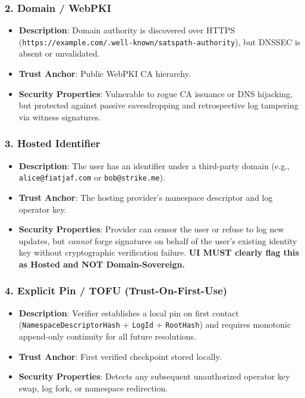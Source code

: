 \documentclass[
]{article}
\providecommand{\tightlist}{%
  \setlength{\itemsep}{0pt}\setlength{\parskip}{0pt}}
\begin{document}
\hypertarget{domain-webpki}{%
\subsubsection{2. Domain / WebPKI}\label{domain-webpki}}

\begin{itemize}
\tightlist
\item
  \textbf{Description}: Domain authority is discovered over HTTPS
  (\texttt{https://example.com/.well-known/satspath-authority}), but
  DNSSEC is absent or unvalidated.
\item
  \textbf{Trust Anchor}: Public WebPKI CA hierarchy.
\item
  \textbf{Security Properties}: Vulnerable to rogue CA issuance or DNS
  hijacking, but protected against passive eavesdropping and
  retrospective log tampering via witness signatures.
\end{itemize}

\hypertarget{hosted-identifier}{%
\subsubsection{3. Hosted Identifier}\label{hosted-identifier}}

\begin{itemize}
\tightlist
\item
  \textbf{Description}: The user has an identifier under a third-party
  domain (e.g., \texttt{alice@fiatjaf.com} or \texttt{bob@strike.me}).
\item
  \textbf{Trust Anchor}: The hosting provider's namespace descriptor and
  log operator key.
\item
  \textbf{Security Properties}: Provider can censor the user or refuse
  to log new updates, but \emph{cannot} forge signatures on behalf of
  the user's existing identity key without cryptographic verification
  failure. \textbf{UI MUST clearly flag this as Hosted and NOT
  Domain-Sovereign.}
\end{itemize}

\hypertarget{explicit-pin-tofu-trust-on-first-use}{%
\subsubsection{4. Explicit Pin / TOFU
(Trust-On-First-Use)}\label{explicit-pin-tofu-trust-on-first-use}}

\begin{itemize}
\tightlist
\item
  \textbf{Description}: Verifier establishes a local pin on first
  contact (\texttt{NamespaceDescriptorHash} + \texttt{LogId} +
  \texttt{RootHash}) and requires monotonic append-only continuity for
  all future resolutions.
\item
  \textbf{Trust Anchor}: First verified checkpoint stored locally.
\item
  \textbf{Security Properties}: Detects any subsequent unauthorized
  operator key swap, log fork, or namespace redirection.
\end{itemize}
\end{document}
